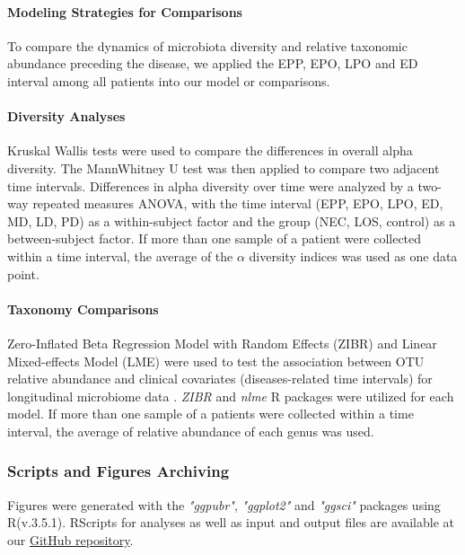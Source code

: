 \documentclass[fleqn,10pt, lineno]{wlpeerj} %
\begin{document}
      \paragraph*{Modeling Strategies for Comparisons}
      To compare the dynamics of microbiota diversity and relative taxonomic abundance preceding the disease, we applied the EPP, EPO, LPO and ED interval among all patients into our model or comparisons.

      \paragraph{Diversity Analyses}
      Kruskal Wallis tests were used to compare the differences in overall alpha diversity. The Mann\-Whitney U test was then applied to compare two adjacent time intervals. Differences in alpha diversity over time were analyzed by a two-way repeated measures ANOVA, with the time interval (EPP, EPO, LPO, ED, MD, LD, PD) as a within-subject factor and the group (NEC, LOS, control) as a between-subject factor.
      If more than one sample of a patient were collected within a time interval, the average of the $\alpha$  diversity indices was used as one data point.

      \paragraph*{Taxonomy Comparisons}
      Zero-Inflated Beta Regression Model with Random Effects (ZIBR) and Linear Mixed-effects Model (LME) were used to test the association between OTU relative abundance and clinical covariates (diseases-related time intervals) for longitudinal microbiome data \citep{chen2016two}. \textit{ZIBR} and \textit{nlme}\citep{nlme} R packages were utilized for each model.
      If more than one sample of a patients were collected within a time interval, the average of relative abundance of each genus was used.

    \subsubsection*{Scripts and Figures Archiving}
    Figures were generated with the \textit{"ggpubr"}\citep{kassambara2017ggpubr},  \textit{"ggplot2"}\citep{ggplot2} and \textit{"ggsci"}\citep{ggsci} packages using R(v.3.5.1).
    RScripts for analyses as well as input and output files are available at our \href{https://github.com/jiayiliujiayi/NEC-LOS-microbiota_pattern_comparison}{GitHub repository}.
\end{document}
